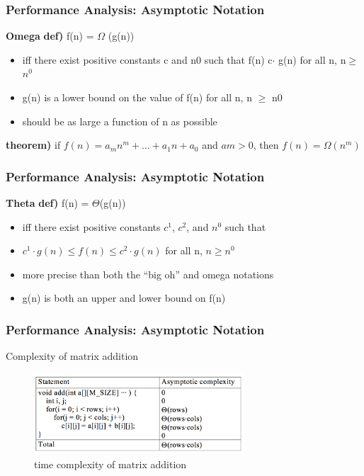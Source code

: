 \documentclass[newPxFont,sthlmFooter,nooffset]{beamer}
\begin{document}
\begin{frame}[t]
  \frametitle{Performance Analysis: Asymptotic Notation}
\textbf{Omega}
\textbf{def)} f(n) = $\Omega$ (g(n))
\begin{itemize}
\item iff there exist positive constants c and n0 such that f(n)
  c$\cdot$ g(n) for all n, n$\geq$ $n^0$
\end{itemize}


\begin{itemize}
\item g(n) is a lower bound on the value of f(n) for all n, n $\geq$ n0
\item should be as large a function of n as possible
\end{itemize}

\textbf{theorem)} if $f(n) = a_mn^m + ... + a_1n + a_0$ and $am > 0$, then $f(n) = \Omega(n^m)$
\end{frame}

\begin{frame}[t]
  \frametitle{Performance Analysis: Asymptotic Notation}
\textbf{  Theta}
\textbf{def)} f(n) =  $\Theta$(g(n))
\begin{itemize}
\item iff there exist positive constants $c^1$, $c^2$, and $n^0$ such that
\item $c^1\cdot g(n) \leq f(n) \leq c^2\cdot g(n)$ for all n, $n\geq n^0$
\end{itemize}

\begin{itemize}
\item  more precise than both the “big oh” and omega notations
\item g(n) is both an upper and lower bound on f(n)
\end{itemize}

\end{frame}

\begin{frame}[t]
  \frametitle{Performance Analysis: Asymptotic Notation}
Complexity of matrix addition
  \begin{figure}[h]
    \centering
    \includegraphics[width=0.7\textwidth]{figures/fig07_complexity.png}
    \caption{time complexity of matrix addition}
  \end{figure}
\end{frame}
\end{document}
